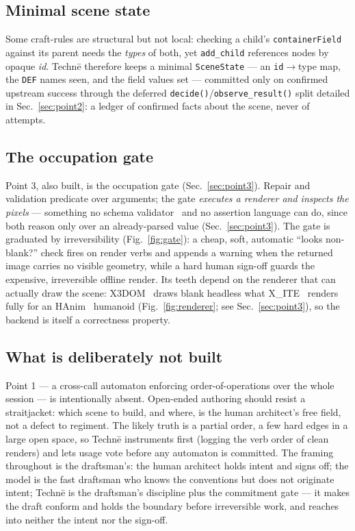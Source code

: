 \documentclass[sigconf,nonacm,screen,anonymous]{acmart}
\begin{document}
\subsection{Minimal scene state}

Some craft-rules are structural but not local: checking a child's \texttt{containerField} against its parent needs the \emph{types} of both, yet \texttt{add\_child} references nodes by opaque \emph{id}. Technē therefore keeps a minimal \texttt{SceneState} --- an \texttt{id}$\rightarrow$type map, the \texttt{DEF} names seen, and the field values set --- committed only on confirmed upstream success through the deferred \texttt{decide()}/\texttt{observe\_result()} split detailed in Sec.~\ref{sec:point2}: a ledger of confirmed facts about the scene, never of attempts.

\subsection{The occupation gate}

Point 3, also built, is the occupation gate (Sec.~\ref{sec:point3}). Repair and validation predicate over arguments; the gate \emph{executes a renderer and inspects the pixels} --- something no schema validator~\cite{jsonschema} and no assertion language can do, since both reason only over an already-parsed value (Sec.~\ref{sec:point3}). The gate is graduated by irreversibility (Fig.~\ref{fig:gate}): a cheap, soft, automatic ``looks non-blank?'' check fires on render verbs and appends a warning when the returned image carries no visible geometry, while a hard human sign-off guards the expensive, irreversible offline render. Its teeth depend on the renderer that can actually draw the scene: X3DOM~\cite{x3dom} draws blank headless what X\_ITE~\cite{xite} renders fully for an HAnim~\cite{hanim} humanoid (Fig.~\ref{fig:renderer}; see Sec.~\ref{sec:point3}), so the backend is itself a correctness property.

\subsection{What is deliberately not built}

Point 1 --- a cross-call automaton enforcing order-of-operations over the whole session --- is intentionally absent. Open-ended authoring should resist a straitjacket: which scene to build, and where, is the human architect's free field, not a defect to regiment. The likely truth is a partial order, a few hard edges in a large open space, so Technē instruments first (logging the verb order of clean renders) and lets usage vote before any automaton is committed. The framing throughout is the draftsman's: the human architect holds intent and signs off; the model is the fast draftsman who knows the conventions but does not originate intent; Technē is the draftsman's discipline plus the commitment gate --- it makes the draft conform and holds the boundary before irreversible work, and reaches into neither the intent nor the sign-off.
\end{document}
